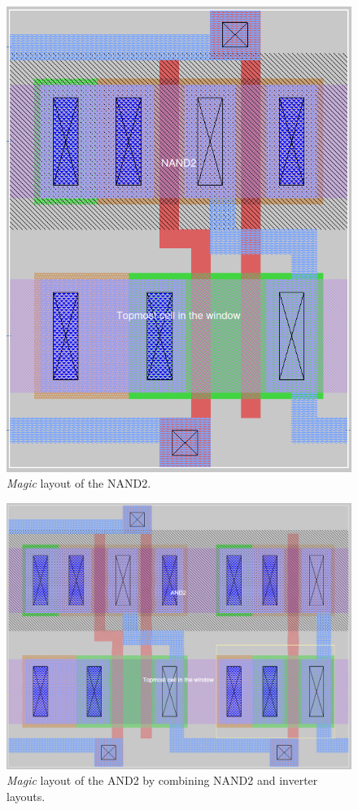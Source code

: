 \documentclass[11pt]{article}
\begin{document}
    \begin{figure}[!ht]
        \centering
        \includegraphics[width=0.8\linewidth]{../img/nand2_mag.png}
        \caption{\textit{Magic} layout of the NAND2.}
        \label{fig:nand2mag}
    \end{figure}
    \begin{figure}[!ht]
        \centering
        \includegraphics[width=\linewidth]{../img/and2mag.png}
        \caption{\textit{Magic} layout of the AND2 by combining NAND2 and inverter layouts.}
        \label{fig:and2mag}
    \end{figure}
\end{document}
